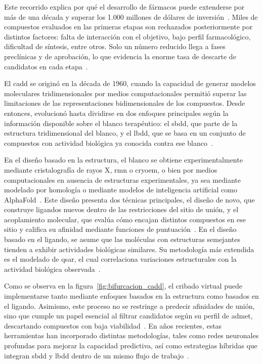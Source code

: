 

Este recorrido explica por qué el desarrollo de fármacos puede extenderse por más de una década y superar los 1.000 millones de dólares de inversión~\cite{hughes2011principles}. Miles de compuestos evaluados en las primeras etapas son rechazados posteriormente por distintos factores: falta de interacción con el objetivo, bajo perfil farmacológico, dificultad de síntesis, entre otros. Solo un número reducido llega a fases preclínicas y de aprobación, lo que evidencia la enorme tasa de descarte de candidatos en cada etapa~\cite{chawla2024computational}.

El \gls{cadd} se originó en la década de 1960, cuando la capacidad de generar modelos moleculares tridimensionales por medios computacionales permitió superar las limitaciones de las representaciones bidimensionales de los compuestos. Desde entonces, evolucionó hasta dividirse en dos enfoques principales según la información disponible sobre el blanco terapéutico: el \gls{sbdd}, que parte de la estructura tridimensional del blanco, y el \gls{lbdd}, que se basa en un conjunto de compuestos con actividad biológica ya conocida contra ese blanco~\cite{chawla2024computational}.



En el diseño basado en la estructura, el blanco se obtiene experimentalmente mediante cristalografía de rayos X, \gls{rmn} o \gls{cryoem}, o bien por medios computacionales en ausencia de estructuras experimentales, ya sea mediante modelado por homología o mediante modelos de inteligencia artificial como AlphaFold~\cite{jumper2021highly}. Este diseño presenta dos técnicas principales, el diseño de novo, que construye ligandos nuevos dentro de las restricciones del sitio de unión, y el acoplamiento molecular, que evalúa cómo encajan distintos compuestos en ese sitio y califica su afinidad mediante funciones de puntuación~\cite{macalino2015role}. En el diseño basado en el ligando, se asume que las moléculas con estructuras semejantes tienden a exhibir actividades biológicas similares. Su metodología más extendida es el modelado de \gls{qsar}, el cual correlaciona variaciones estructurales con la actividad biológica observada~\cite{chawla2024computational}.

Como se observa en la figura~\ref{fig:bifurcacion_cadd}, el cribado virtual puede implementarse tanto mediante enfoques basados en la estructura como basados en el ligando. Asimismo, este proceso no se restringe a predecir afinidades de unión, sino que cumple un papel esencial al filtrar candidatos según su perfil de \gls{admet}, descartando compuestos con baja viabilidad~\cite{macalino2015role}. En años recientes, estas herramientas han incorporado distintas metodologías, tales como redes neuronales profundas para mejorar la capacidad predictiva, así como estrategias híbridas que integran \gls{sbdd} y \gls{lbdd} dentro de un mismo flujo de trabajo~\cite{chawla2024computational}.

